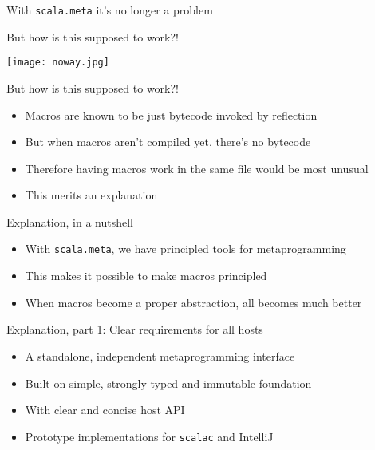 \documentclass[svgnames,dvipsnames,hyperref={bookmarks=false},usepdftitle=false]{beamer}
\begin{document}
\begin{frame}{With \texttt{scala.meta} it's no longer a problem}
\vskip35pt
\begin{center}
\end{center}
\end{frame}

\begin{frame}[c, fragile]{But how is this supposed to work?!}
\begin{center}
\texttt{[image: noway.jpg]}
\end{center}
\end{frame}

\begin{frame}{But how is this supposed to work?!}
\begin{itemize}
\item Macros are known to be just bytecode invoked by reflection
\item But when macros aren't compiled yet, there's no bytecode
\item Therefore having macros work in the same file would be most unusual
\item This merits an explanation
\end{itemize}
\end{frame}

\begin{frame}{Explanation, in a nutshell}
\begin{itemize}
\item With \texttt{scala.meta}, we have principled tools for metaprogramming
\item This makes it possible to make macros principled
\item When macros become a proper abstraction, all becomes much better
\end{itemize}
\end{frame}

\begin{frame}{Explanation, part 1: Clear requirements for all hosts}
\begin{itemize}
\item A standalone, independent metaprogramming interface
\item Built on simple, strongly-typed and immutable foundation
\item With clear and concise host API
\item Prototype implementations for \texttt{scalac} and IntelliJ
\end{itemize}
\end{frame}
\end{document}
